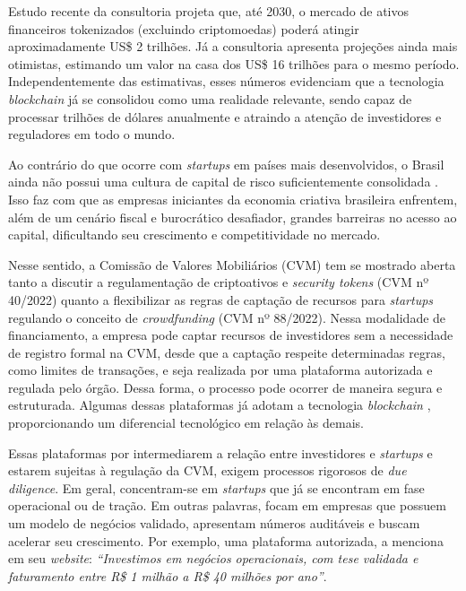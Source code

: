 \documentclass[12pt, a4paper, oneside, openright, chapter=TITLE]{abntex2}
\begin{document}
Estudo recente da consultoria  projeta que, até 2030, o mercado de ativos financeiros tokenizados (excluindo criptomoedas) poderá atingir aproximadamente US\$ 2 trilhões. Já a consultoria  apresenta projeções ainda mais otimistas, estimando um valor na casa dos US\$ 16 trilhões para o mesmo período. Independentemente das estimativas, esses números evidenciam que a tecnologia \textit{blockchain} já se consolidou como uma realidade relevante, sendo capaz de processar trilhões de dólares anualmente e atraindo a atenção de investidores e reguladores em todo o mundo.

Ao contrário do que ocorre com \textit{startups} em países mais desenvolvidos, o Brasil ainda não possui uma cultura de capital de risco suficientemente consolidada \cite{lazzarini2018}. Isso faz com que as empresas iniciantes da economia criativa brasileira enfrentem, além de um cenário fiscal e burocrático desafiador, grandes barreiras no acesso ao capital, dificultando seu crescimento e competitividade no mercado.

Nesse sentido, a Comissão de Valores Mobiliários (CVM) tem se mostrado aberta tanto a discutir a regulamentação de criptoativos e \textit{security tokens} (CVM nº 40/2022) quanto a flexibilizar as regras de captação de recursos para \textit{startups} regulando o conceito de \textit{crowdfunding} (CVM nº 88/2022). Nessa modalidade de financiamento, a empresa pode captar recursos de investidores sem a necessidade de registro formal na CVM, desde que a captação respeite determinadas regras, como limites de transações, e seja realizada por uma plataforma autorizada e regulada pelo órgão. Dessa forma, o processo pode ocorrer de maneira segura e estruturada. Algumas dessas plataformas já adotam a tecnologia \textit{blockchain} \cite{ruffoni2020}, proporcionando um diferencial tecnológico em relação às demais.

Essas plataformas por intermediarem a relação entre investidores e \textit{startups} e estarem sujeitas à regulação da CVM, exigem processos rigorosos de \textit{due diligence}. Em geral, concentram-se em \textit{startups} que já se encontram em fase operacional ou de tração. Em outras palavras, focam em empresas que possuem um modelo de negócios validado, apresentam números auditáveis e buscam acelerar seu crescimento. Por exemplo, uma plataforma autorizada, a  menciona em seu \textit{website}: \textit{“Investimos em negócios operacionais, com tese validada e faturamento entre R\$ 1 milhão a R\$ 40 milhões por ano”}.
\end{document}
